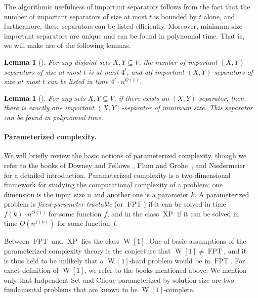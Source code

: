 \documentclass[a4paper,11pt]{article}
\newtheorem{lemma}[theorem]{Lemma}
\theoremstyle{definition}
\theoremstyle{remark}
\DeclareMathOperator{\operatorClassFPT}{FPT}
\newcommand{\classFPT}{\ensuremath{\operatorClassFPT}}
\DeclareMathOperator{\operatorClassW}{W}
\newcommand{\classW}[1]{\ensuremath{\operatorClassW[#1]}}
\DeclareMathOperator{\operatorClassXP}{XP}
\newcommand{\classXP}{\ensuremath{\operatorClassXP}}
\begin{document}
The algorithmic usefulness of important separators follows from the fact that the number of important separators of size at most $t$ is bounded by $t$ alone, and furthermore, these separators can be listed efficiently. Moreover, minimum-size important separators are unique and can be found in polynomial time. That is, we will make use of the following lemmas.

\begin{lemma}[\cite{chen2009improved}]\label{lemma:computing_imp_seps}
For any disjoint sets $X, Y \subseteq V$, the number of important $(X,Y)$-separators of size at most $t$ is at most $4^{t}$, and all important $(X,Y)$-separators of size at most $t$ can be listed in time $4^{t}\cdot n^{O(1)}$.
\end{lemma}

\begin{lemma}[\cite{marx2006parameterized}]\label{lemma:unique_min_sep}
For any sets $X, Y \subseteq V$, if there exists an $(X,Y)$-separator, then there is exactly one important $(X,Y)$-separator of minimum size. This separator can be found in polynomial time.
\end{lemma}

\paragraph{Parameterized complexity.} We will briefly review the basic notions of parameterized complexity, though we refer to the books of Downey and Fellows~\cite{DowneyF99}, Flum and Grohe~\cite{FlumG06}, and   Niedermeier~\cite{Niedermeierbook06} for a detailed introduction. 
Parameterized complexity is a two-dimensional framework for studying the computational complexity of a problem; one dimension is the input size
$n$ and another one is a parameter $k$. A parameterized problem is \emph{fixed-parameter tractable} (or \classFPT) if it can be solved in time $f(k)\cdot n^{O(1)}$ for some function $f$, and in the class \classXP{} if it can be solved in time $O\left(n^{f(k)}\right)$ for some function $f$.

Between \classFPT{} and \classXP{} lies the class \classW{1}. One of basic assumptions of the parameterized complexity theory is the conjecture that $\classW{1}\neq \classFPT$, and it is thus held to be unlikely that a \classW{1}-hard problem would be in \classFPT{}. For exact definition of \classW{1}, 
we refer to the books mentioned above.  We mention only that {\sc Indpendent Set} and {\sc Clique}
parameterized by solution size are two fundamental problems that are known to be \classW{1}-complete.
\end{document}
